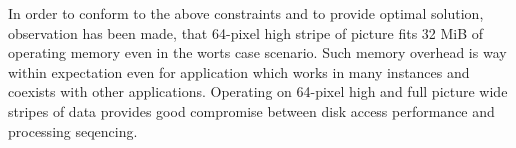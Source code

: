 In order to conform to the above constraints and to provide optimal solution, observation has been made, that 64-pixel high stripe of picture fits 32 MiB of operating memory even in the worts case scenario. Such memory overhead is way within expectation even for application which works in many instances and coexists with other applications. Operating on 64-pixel high and full picture wide stripes of data provides good compromise between disk access performance and processing seqencing.